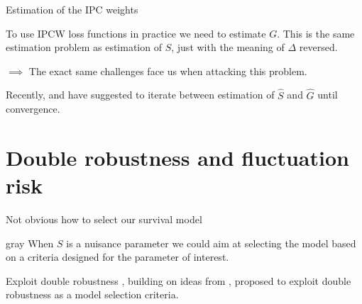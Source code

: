 \documentclass[smaller]{beamer}\usepackage{listings}
\begin{document}
\begin{frame}[label={sec:org4fef6fe}]{Estimation of the IPC weights}
\small

To use IPCW loss functions in practice we need to estimate \(G\). This is the same estimation
problem as estimation of \(S\), just with the meaning of \(\Delta\) reversed. 

\vfill \pause

\(\implies\) The exact same challenges face us when attacking this problem.

\vfill

\def\shift{2.3}
\def\ls{}
\def\lw{.5mm}
\begin{center}
\end{center}

\vfill

Recently, \cite{han2021inverse} and \cite{westling2021inference} have suggested to iterate between
estimation of \(\hat S\) and \(\hat G\) until convergence.
\end{frame}


\section{Double robustness and fluctuation risk}
\label{sec:orgdde4964}
\begin{frame}[label={sec:org2931615}]{}
\begin{block}{\centering Not obvious how to select our survival model}
\pause
\end{block}
\begin{block}{}
\end{block}
\begin{beamercolorbox}[rounded=true]{gray}
\centering When \(S\) is a nuisance parameter we could aim at selecting the model based on a
criteria designed for the parameter of interest. \pause
\end{beamercolorbox}

\begin{block}{}
\end{block}

\begin{block}{Exploit double robustness}
\pause \cite{tchetgenYifanTagetDML}, building on ideas from \cite{robins2007comment}, proposed to
exploit double robustness as a model selection criteria.
\end{block}
\end{frame}
\end{document}
